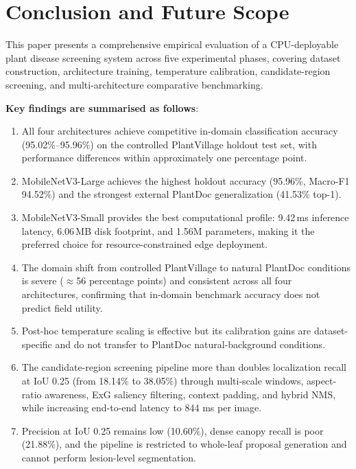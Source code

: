 \documentclass[pdflatex,sn-mathphys-num]{sn-jnl}
\theoremstyle{thmstyleone}%
\theoremstyle{thmstyletwo}%
\theoremstyle{thmstylethree}%
\begin{document}
\section{Conclusion and Future Scope}
\label{sec:conclusion}

This paper presents a comprehensive empirical evaluation of a CPU-deployable plant
disease screening system across five experimental phases, covering dataset construction,
architecture training, temperature calibration, candidate-region screening, and
multi-architecture comparative benchmarking.

\textbf{Key findings are summarised as follows}:
\begin{enumerate}
  \item All four architectures achieve competitive in-domain classification accuracy
        (95.02\%--95.96\%) on the controlled PlantVillage holdout test set, with
        performance differences within approximately one percentage point.
  \item MobileNetV3-Large achieves the highest holdout accuracy (95.96\%, Macro-F1
        94.52\%) and the strongest external PlantDoc generalization (41.53\% top-1).
  \item MobileNetV3-Small provides the best computational profile: 9.42\,ms inference
        latency, 6.06\,MB disk footprint, and 1.56M parameters, making it the preferred
        choice for resource-constrained edge deployment.
  \item The domain shift from controlled PlantVillage to natural PlantDoc conditions is
        severe ($\approx$56 percentage points) and consistent across all four architectures,
        confirming that in-domain benchmark accuracy does not predict field utility.
  \item Post-hoc temperature scaling is effective but its calibration gains are
        dataset-specific and do not transfer to PlantDoc natural-background conditions.
  \item The candidate-region screening pipeline more than doubles localization recall at
        IoU 0.25 (from 18.14\% to 38.05\%) through multi-scale windows, aspect-ratio
        awareness, ExG saliency filtering, context padding, and hybrid NMS, while
        increasing end-to-end latency to 844 ms per image.
  \item Precision at IoU 0.25 remains low (10.60\%), dense canopy recall is poor
        (21.88\%), and the pipeline is restricted to whole-leaf proposal generation and
        cannot perform lesion-level segmentation.
\end{enumerate}
\end{document}
